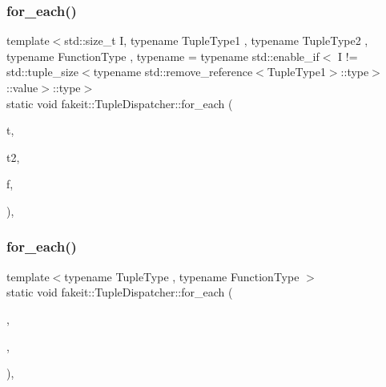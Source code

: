 \mbox{\label{structfakeit_1_1TupleDispatcher_a42566b7faaac776dc99492e7c0b973b3}} 
\subsubsection{\texorpdfstring{for\_each()}{for\_each()}\hspace{0.1cm}{\footnotesize\ttfamily [24/54]}}
{\footnotesize\ttfamily template$<$std\+::size\+\_\+t I, typename Tuple\+Type1 , typename Tuple\+Type2 , typename Function\+Type , typename  = typename std\+::enable\+\_\+if$<$            I != std\+::tuple\+\_\+size$<$typename std\+::remove\+\_\+reference$<$\+Tuple\+Type1$>$\+::type$>$\+::value$>$\+::type$>$ \\
static void fakeit\+::\+Tuple\+Dispatcher\+::for\+\_\+each (\begin{DoxyParamCaption}\item[{Tuple\+Type1 \&\&}]{t,  }\item[{Tuple\+Type2 \&\&}]{t2,  }\item[{Function\+Type \&}]{f,  }\item[{std\+::integral\+\_\+constant$<$ size\+\_\+t, I $>$}]{ }\end{DoxyParamCaption})\hspace{0.3cm}{\ttfamily [inline]}, {\ttfamily [static]}}

\mbox{\label{structfakeit_1_1TupleDispatcher_af22c1fae8c695f722da986df9af411ca}} 
\subsubsection{\texorpdfstring{for\_each()}{for\_each()}\hspace{0.1cm}{\footnotesize\ttfamily [25/54]}}
{\footnotesize\ttfamily template$<$typename Tuple\+Type , typename Function\+Type $>$ \\
static void fakeit\+::\+Tuple\+Dispatcher\+::for\+\_\+each (\begin{DoxyParamCaption}\item[{Tuple\+Type \&\&}]{,  }\item[{Function\+Type \&}]{,  }\item[{std\+::integral\+\_\+constant$<$ size\+\_\+t, std\+::tuple\+\_\+size$<$ typename std\+::remove\+\_\+reference$<$ Tuple\+Type $>$\+::type $>$\+::value $>$}]{ }\end{DoxyParamCaption})\hspace{0.3cm}{\ttfamily [inline]}, {\ttfamily [static]}}

